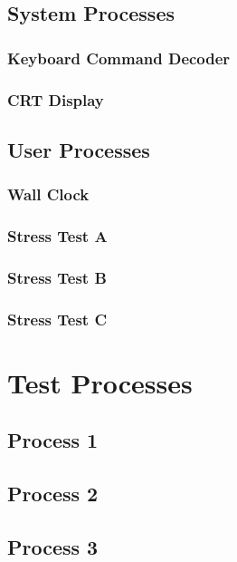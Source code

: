 \documentclass[se]{uw-wkrpt}
\begin{document}
\subsection{System Processes}


\subsubsection{Keyboard Command Decoder}

\subsubsection{CRT Display}

\subsection{User Processes}

\subsubsection{Wall Clock}

\subsubsection{Stress Test A}

\subsubsection{Stress Test B}

\subsubsection{Stress Test C}

\section{Test Processes}\label{sec:testproc}

\subsection{Process 1}

\subsection{Process 2}

\subsection{Process 3}
\end{document}
